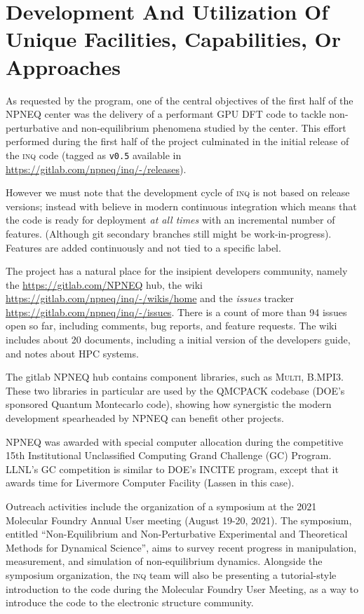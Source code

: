 \section{Development And Utilization Of Unique Facilities, Capabilities, Or Approaches}
\label{sec:development}


As requested by the program, one of the central objectives of the first half of the NPNEQ center was the delivery of a performant GPU DFT code to tackle non-perturbative and non-equilibrium phenomena studied by the center.
This effort performed during the first half of the project culminated in the initial release of the \textsc{inq} code (tagged as \texttt{v0.5} available in \url{https://gitlab.com/npneq/inq/-/releases}).

However we must note that the development cycle of \textsc{inq} is not based on release versions; instead with believe in modern continuous integration which means that the code is ready for deployment \emph{at all times} with an incremental number of features.
(Although git secondary branches still might be work-in-progress).
Features are added continuously and not tied to a specific label.

The project has a natural place for the insipient developers community, namely the \url{https://gitlab.com/NPNEQ} hub, the wiki \url{https://gitlab.com/npneq/inq/-/wikis/home} and the \emph{issues} tracker \url{https://gitlab.com/npneq/inq/-/issues}.
There is a count of more than 94 issues open so far, including comments, bug reports, and feature requests.
The wiki includes about 20 documents, including a initial version of the developers guide, and notes about HPC systems.

The gitlab NPNEQ hub contains component libraries, such as \textsc{Multi}, \textsc{B.MPI3}.
These two libraries in particular are used by the QMCPACK codebase (DOE's sponsored Quantum Montecarlo code), showing how synergistic the modern development spearheaded by NPNEQ can benefit other projects.

NPNEQ was awarded with special computer allocation during the competitive 15th
Institutional Unclassified Computing Grand Challenge (GC) Program.
LLNL's GC competition is similar to DOE's INCITE program, except that it awards time for Livermore Computer Facility (Lassen in this case).

Outreach activities include the organization of a symposium at the 2021 Molecular Foundry Annual User meeting (August 19-20, 2021). 
The symposium, entitled ``Non-Equilibrium and Non-Perturbative Experimental and Theoretical Methods for Dynamical Science'', aims to survey recent progress in manipulation, measurement, and simulation of non-equilibrium dynamics.
Alongside the symposium organization, the \textsc{inq} team will also be presenting a tutorial-style introduction to the code during the Molecular Foundry User Meeting, as a way to introduce the code to the electronic structure community.

